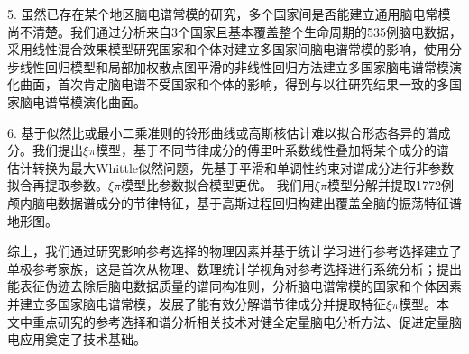 \begin{chineseabstract}
5. 虽然已存在某个地区脑电谱常模的研究，多个国家间是否能建立通用脑电常模尚不清楚。我们通过分析来自3个国家且基本覆盖整个生命周期的535例脑电数据，采用线性混合效果模型研究国家和个体对建立多国家间脑电谱常模的影响，使用分步线性回归模型和局部加权散点图平滑的非线性回归方法建立多国家脑电谱常模演化曲面，首次肯定脑电谱不受国家和个体的影响，得到与以往研究结果一致的多国家脑电谱常模演化曲面。

6. 基于似然比或最小二乘准则的铃形曲线或高斯核估计难以拟合形态各异的谱成分。我们提出$\xi\pi$模型，基于不同节律成分的傅里叶系数线性叠加将某个成分的谱估计转换为最大Whittle似然问题，先基于平滑和单调性约束对谱成分进行非参数拟合再提取参数。$\xi\pi$模型比参数拟合模型更优。
我们用$\xi\pi$模型分解并提取1772例颅内脑电数据谱成分的节律特征，基于高斯过程回归构建出覆盖全脑的振荡特征谱地形图。

综上，我们通过研究影响参考选择的物理因素并基于统计学习进行参考选择建立了单极参考家族，这是首次从物理、数理统计学视角对参考选择进行系统分析；提出能表征伪迹去除后脑电数据质量的谱同构准则，分析脑电谱常模的国家和个体因素并建立多国家脑电谱常模，发展了能有效分解谱节律成分并提取特征$\xi\pi$模型。本文中重点研究的参考选择和谱分析相关技术对健全定量脑电分析方法、促进定量脑电应用奠定了技术基础。

\end{chineseabstract}


